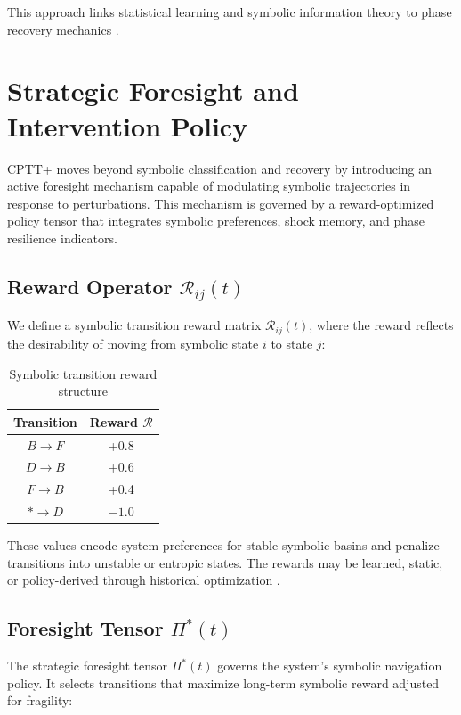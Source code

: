 \documentclass[12pt]{article}
\begin{document}
This approach links statistical learning and symbolic information theory to phase recovery mechanics \cite{tishby2000information, zhang2022symbolic}.

\section{Strategic Foresight and Intervention Policy}

CPTT+ moves beyond symbolic classification and recovery by introducing an active foresight mechanism capable of modulating symbolic trajectories in response to perturbations. This mechanism is governed by a reward-optimized policy tensor that integrates symbolic preferences, shock memory, and phase resilience indicators.

\subsection{Reward Operator $\mathcal{R}_{ij}(t)$}

We define a symbolic transition reward matrix $\mathcal{R}_{ij}(t)$, where the reward reflects the desirability of moving from symbolic state $i$ to state $j$:

\begin{table}[h]
\centering
\begin{tabular}{|c|c|}
\hline
\textbf{Transition} & \textbf{Reward} $\mathcal{R}$ \\
\hline
$B \rightarrow F$ & +0.8 \\
$D \rightarrow B$ & +0.6 \\
$F \rightarrow B$ & +0.4 \\
$\ast \rightarrow D$ & $-1.0$ \\
\hline
\end{tabular}
\caption{Symbolic transition reward structure}
\end{table}

These values encode system preferences for stable symbolic basins and penalize transitions into unstable or entropic states. The rewards may be learned, static, or policy-derived through historical optimization \cite{sutton2018reinforcement}.

\subsection{Foresight Tensor $\Pi^*(t)$}

The strategic foresight tensor $\Pi^*(t)$ governs the system’s symbolic navigation policy. It selects transitions that maximize long-term symbolic reward adjusted for fragility:
\end{document}

